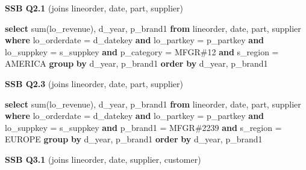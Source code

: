 \documentclass[
]{article}
\newenvironment{Shaded}{}{}
\newcommand{\DataTypeTok}[1]{\textcolor[rgb]{0.56,0.13,0.00}{#1}}
\newcommand{\FunctionTok}[1]{\textcolor[rgb]{0.02,0.16,0.49}{#1}}
\newcommand{\KeywordTok}[1]{\textcolor[rgb]{0.00,0.44,0.13}{\textbf{#1}}}
\newcommand{\NormalTok}[1]{#1}
\newcommand{\OperatorTok}[1]{\textcolor[rgb]{0.40,0.40,0.40}{#1}}
\newcommand{\StringTok}[1]{\textcolor[rgb]{0.25,0.44,0.63}{#1}}
\begin{document}
\textbf{SSB Q2.1} (joins lineorder, date, part, supplier)

\begin{Shaded}
\begin{Highlighting}[]
\KeywordTok{select} \FunctionTok{sum}\NormalTok{(lo\_revenue), d\_year, p\_brand1}
\KeywordTok{from}\NormalTok{ lineorder, }\DataTypeTok{date}\NormalTok{, part, supplier}
\KeywordTok{where}\NormalTok{ lo\_orderdate }\OperatorTok{=}\NormalTok{ d\_datekey }\KeywordTok{and}\NormalTok{ lo\_partkey }\OperatorTok{=}\NormalTok{ p\_partkey }\KeywordTok{and}\NormalTok{ lo\_suppkey }\OperatorTok{=}\NormalTok{ s\_suppkey }\KeywordTok{and}\NormalTok{ p\_category }\OperatorTok{=} \StringTok{\textquotesingle{}MFGR\#12\textquotesingle{}} \KeywordTok{and}\NormalTok{ s\_region }\OperatorTok{=} \StringTok{\textquotesingle{}AMERICA\textquotesingle{}}
\KeywordTok{group} \KeywordTok{by}\NormalTok{ d\_year, p\_brand1}
\KeywordTok{order} \KeywordTok{by}\NormalTok{ d\_year, p\_brand1}
\end{Highlighting}
\end{Shaded}

\textbf{SSB Q2.3} (joins lineorder, date, part, supplier)

\begin{Shaded}
\begin{Highlighting}[]
\KeywordTok{select} \FunctionTok{sum}\NormalTok{(lo\_revenue), d\_year, p\_brand1}
\KeywordTok{from}\NormalTok{ lineorder, }\DataTypeTok{date}\NormalTok{, part, supplier}
\KeywordTok{where}\NormalTok{ lo\_orderdate }\OperatorTok{=}\NormalTok{ d\_datekey }\KeywordTok{and}\NormalTok{ lo\_partkey }\OperatorTok{=}\NormalTok{ p\_partkey }\KeywordTok{and}\NormalTok{ lo\_suppkey }\OperatorTok{=}\NormalTok{ s\_suppkey }\KeywordTok{and}\NormalTok{ p\_brand1 }\OperatorTok{=} \StringTok{\textquotesingle{}MFGR\#2239\textquotesingle{}} \KeywordTok{and}\NormalTok{ s\_region }\OperatorTok{=} \StringTok{\textquotesingle{}EUROPE\textquotesingle{}}
\KeywordTok{group} \KeywordTok{by}\NormalTok{ d\_year, p\_brand1}
\KeywordTok{order} \KeywordTok{by}\NormalTok{ d\_year, p\_brand1}
\end{Highlighting}
\end{Shaded}

\textbf{SSB Q3.1} (joins lineorder, date, supplier, customer)
\end{document}
